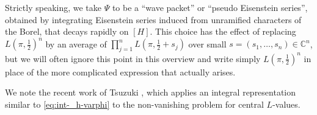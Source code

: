 Strictly speaking, we take $\Psi$ to be a ``wave packet'' or ``pseudo Eisenstein series'', obtained by integrating Eisenstein series induced from unramified characters of the Borel, that decays rapidly on $[H]$.  This choice has the effect of replacing $L(\pi,\tfrac{1}{2})^n$ by an average of $\prod_{j=1}^n L(\pi,\tfrac{1}{2} + s_j)$ over small $s = (s_1,\dotsc,s_n) \in \mathbb{C}^n$, but we will often ignore this point in this overview and write simply $L(\pi,\tfrac{1}{2})^n$ in place of the more complicated expression that actually arises.

We note the recent work of Tsuzuki \cite{2021arXiv210307835T}, which applies an integral representation similar to \eqref{eq:int-_h-varphi} to the non-vanishing problem for central $L$-values.





